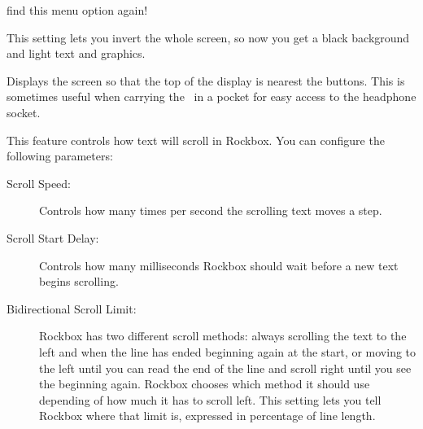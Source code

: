 \begin{description}
{\begin{description}
{           find this menu option again!}
       \item[LCD Mode:]
         This setting lets you invert the whole screen, so now you get a
         black background and light text and graphics.
       \item[Upside Down:]
         Displays the screen so that the top of the display is nearest 
         the buttons. This is sometimes useful when carrying the \dap\ in a
         pocket for easy access to the headphone socket.
    \end{description}
  }
%
  \item[Scrolling]
    This feature controls how text will scroll in Rockbox. You can configure
    the following parameters:
    \begin{description}
    \item[Scroll Speed:]
      Controls how many times per second the scrolling text moves a step.
    \item[Scroll Start Delay:]
      Controls how many milliseconds Rockbox should wait before a new
      text begins scrolling.
    \item[Bidirectional Scroll Limit:]
      Rockbox has two different scroll methods: always scrolling the text
      to the left and when the line has ended beginning again at the start,
      or moving to the left until you can read the end of the line and scroll
      right until you see the beginning again. Rockbox chooses which method
      it should use depending of how much it has to scroll left. This setting
      lets you tell Rockbox where that limit is, expressed in percentage of
      line length.
\end{description}
\end{description}
